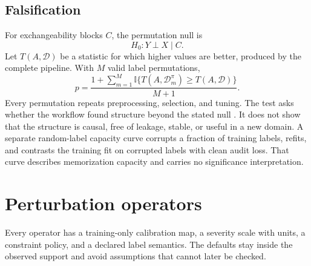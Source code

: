 \documentclass[10pt,twocolumn]{article}
\newcommand{\ind}{\mathbb{I}}
\newcommand{\data}{\mathcal{D}}
\begin{document}
\subsection{Falsification}

For exchangeability blocks \(C\), the permutation null is
\[
  H_0: Y\perp X\mid C.
\]
Let \(T(A,\data)\) be a statistic for which higher values are better, produced by the complete pipeline. With \(M\) valid label permutations,
\begin{equation}
  p=\frac{1+\sum_{m=1}^M
  \ind\{T(A,\data_m^{\pi})\geq T(A,\data)\}}
  {M+1}.
  \label{eq:permutation}
\end{equation}
Every permutation repeats preprocessing, selection, and tuning. The test asks whether the workflow found structure beyond the stated null \citep{ojala2010permutation}. It does not show that the structure is causal, free of leakage, stable, or useful in a new domain. A separate random-label capacity curve corrupts a fraction of training labels, refits, and contrasts the training fit on corrupted labels with clean audit loss. That curve describes memorization capacity and carries no significance interpretation.

\section{Perturbation operators}

Every operator has a training-only calibration map, a severity scale with units, a constraint policy, and a declared label semantics. The defaults stay inside the observed support and avoid assumptions that cannot later be checked.
\end{document}
